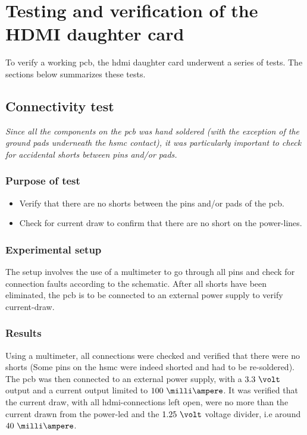 \documentclass[main.tex]{subfiles}
\begin{document}
\chapter{Testing and verification of the HDMI daughter card}
To verify a working \gls{pcb}, the \gls{hdmi} daughter card underwent a series of tests. The sections below summarizes these tests. 

\section{Connectivity test}

\textit{Since all the components on the \gls{pcb} was hand soldered (with the exception of the ground pads underneath the \gls{hsmc} contact), it was particularly important to check for accidental shorts between pins and/or pads.}

\subsection{Purpose of test}

\begin{itemize}\setlength{\itemsep}{10pt}
\item Verify that there are no shorts between the pins and/or pads of the \gls{pcb}. 
\item Check for current draw to confirm that there are no short on the power-lines.
\end{itemize}

\subsection{Experimental setup}

The setup involves the use of a multimeter to go through all pins and check for connection faults according to the schematic. After all shorts have been eliminated, the \gls{pcb} is to be connected to an external power supply to verify current-draw. 

\subsection{Results}
 Using a multimeter, all connections were checked and verified that there were no shorts (Some pins on the \gls{hsmc} were indeed shorted and had to be re-soldered). The \gls{pcb} was then connected to an external power supply, with a $3.3~\volt$ output and a current output limited to $100~\milli\ampere$. It was verified that the current draw, with all \gls{hdmi}-connections left open, were no more than the current drawn from the power-\acrshort{led} and the $1.25~\volt$ voltage divider, i.e around $40~\milli\ampere$. \\
\end{document}
